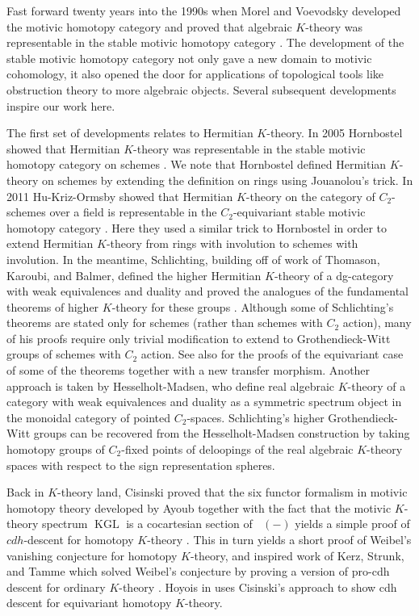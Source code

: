 \documentclass[edeposit,fullpage]{uiucthesis2009}
\DeclareMathOperator{\KGL}{KGL}
\DeclareMathOperator{\SH}{\underline{SH}}
\theoremstyle{plain}
\numberwithin{lemma}{section}
\theoremstyle{definition}
\begin{document}
Fast forward twenty years into the 1990s when Morel and Voevodsky
developed the motivic homotopy category and proved that algebraic
$K$-theory was representable in the stable motivic homotopy category
\cite{MorelVoev}. The development of the stable motivic homotopy
category not only gave a new domain to motivic cohomology, it also
opened the door for applications of topological tools like obstruction
theory to
more algebraic objects. Several
subsequent developments inspire our work here.

The first set of developments relates to Hermitian $K$-theory. In 2005 Hornbostel showed that Hermitian $K$-theory was
representable in the stable motivic homotopy category on schemes
\cite{Hornbos2005}. We note that Hornbostel defined
Hermitian $K$-theory on schemes by extending the definition on rings
using Jouanolou's trick. In 2011 Hu-Kriz-Ormsby showed that Hermitian
$K$-theory on the category of $C_2$-schemes over a field is representable in the
$C_2$-equivariant stable motivic homotopy category \cite{HuKriz}. Here
they used a similar trick to Hornbostel in order to extend Hermitian
$K$-theory from rings with involution to schemes with involution. In
the meantime, Schlichting, building off of work of Thomason,
Karoubi, and Balmer, defined the higher Hermitian $K$-theory of a dg-category
with weak equivalences and duality and proved the analogues of the
fundamental theorems of higher $K$-theory for these groups
\cite{Schder}. Although some of Schlichting's theorems are stated only
for schemes (rather than schemes with $C_2$ action), many of his
proofs require only trivial modification to extend to Grothendieck-Witt
groups of schemes with $C_2$ action. See also \cite{Xie2018ATM} for
the proofs of the equivariant case of some of the theorems together with a new
transfer morphism. Another approach is taken by Hesselholt-Madsen, who
define real algebraic $K$-theory of a category with weak equivalences
and duality as a symmetric spectrum object in the monoidal category of
pointed $C_2$-spaces. Schlichting's higher Grothendieck-Witt groups can be
recovered from the Hesselholt-Madsen construction by taking
homotopy groups of $C_2$-fixed points of deloopings of the real
algebraic $K$-theory spaces with respect to the sign representation spheres. 

Back in $K$-theory land, Cisinski proved that the six
functor formalism in motivic homotopy theory developed by Ayoub
\cite{Ayoub} together with the fact that the motivic $K$-theory
spectrum $\KGL$ is a cocartesian section of $\SH(-)$ yields a simple
proof of $cdh$-descent for homotopy $K$-theory \cite{DenRep}. This in
turn yields a short proof of Weibel's vanishing conjecture for homotopy
$K$-theory, and inspired work of Kerz, Strunk, and Tamme which solved
Weibel's conjecture by proving a version of pro-cdh descent for
ordinary $K$-theory \cite{KerzStrunkTamme}. Hoyois in \cite{cdhdesc}
uses Cisinski's approach to show cdh descent for equivariant homotopy $K$-theory.
\end{document}
